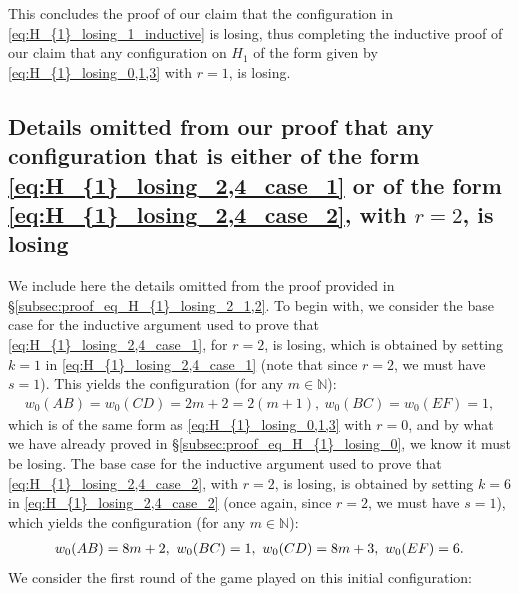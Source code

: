\documentclass[11pt,reqno]{amsart}
\theoremstyle{definition}
\theoremstyle{definition}
\begin{document}
This concludes the proof of our claim that the configuration in \eqref{eq:H_{1}_losing_1_inductive} is losing, thus completing the inductive proof of our claim that any configuration on $H_{1}$ of the form given by \eqref{eq:H_{1}_losing_0,1,3} with $r=1$, is losing.

\subsection{Details omitted from our proof that any configuration that is either of the form \eqref{eq:H_{1}_losing_2,4_case_1} or of the form \eqref{eq:H_{1}_losing_2,4_case_2}, with $r=2$, is losing}\label{subsec:H_{1}_losing_2_1,2_base_cases}
We include here the details omitted from the proof provided in \S\ref{subsec:proof_eq_H_{1}_losing_2_1,2}. To begin with, we consider the base case for the inductive argument used to prove that \eqref{eq:H_{1}_losing_2,4_case_1}, for $r=2$, is losing, which is obtained by setting $k=1$ in \eqref{eq:H_{1}_losing_2,4_case_1} (note that since $r=2$, we must have $s=1$). This yields the configuration (for any $m \in \mathbb{N}$):
\begin{align}
w_{0}(AB)=w_{0}(CD)=2m+2=2(m+1),\ w_{0}(BC)=w_{0}(EF)=1,\nonumber
\end{align}
which is of the same form as \eqref{eq:H_{1}_losing_0,1,3} with $r=0$, and by what we have already proved in \S\ref{subsec:proof_eq_H_{1}_losing_0}, we know it must be losing. The base case for the inductive argument used to prove that \eqref{eq:H_{1}_losing_2,4_case_2}, with $r=2$, is losing, is obtained by setting $k=6$ in \eqref{eq:H_{1}_losing_2,4_case_2} (once again, since $r=2$, we must have $s=1$), which yields the configuration (for any $m \in \mathbb{N}$):
\begin{align}
w_{0}(AB)=8m+2,\ w_{0}(BC)=1,\ w_{0}(CD)=8m+3,\ w_{0}(EF)=6.\label{eq:base_case_H_{1}_losing_2_2}
\end{align}
We consider the first round of the game played on this initial configuration:
\end{document}
